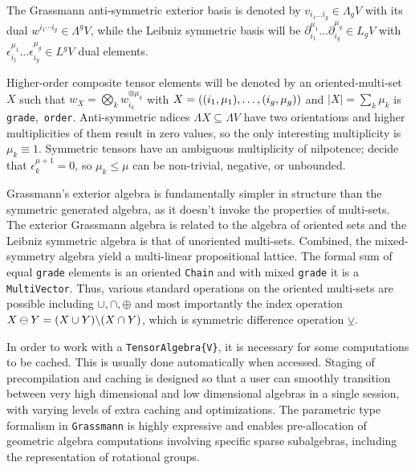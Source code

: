 \documentclass{juliacon}
\begin{document}
\begin{definition}
	The Grassmann anti-symmetric exterior basis is denoted by $v_{i_1\dots i_g}\in\Lambda_gV$ with its dual $w^{i_1\cdots i_g}\in\Lambda^gV$, while the Leibniz symmetric basis will be $\partial_{i_1}^{\mu_1}\dots\partial_{i_g}^{\mu_g}\in L_gV$ with $\epsilon_{i_1}^{\mu_1}\dots\epsilon_{i_g}^{\mu_g}\in L^gV$ dual elements.
\end{definition}
Higher-order composite tensor elements will be denoted by an oriented-multi-set $X$ %
such that $w_X = \bigotimes_k w_{i_k}^{\otimes\mu_k}$ with $X = \left((i_1,\mu_1),\dots,(i_g,\mu_g)\right)$ and $|X|=\sum_k\mu_k$ is \verb`grade`,$\,$ \verb`order`.
Anti-symmetric ndices $\Lambda X\subseteq\Lambda V$ have two orientations and higher multiplicities of them result in zero values, so the only interesting multiplicity is $\mu_k\equiv 1$.
Symmetric tensors have an ambiguous multiplicity of nilpotence; decide that $\epsilon_k^{\mu+1}=0$, so $\mu_k\leq\mu$ can be non-trivial, negative, or unbounded.

Grassmann's exterior algebra is fundamentally simpler in structure than the symmetric generated algebra, as it doesn't invoke the properties of multi-sets.
The exterior Grassmann algebra is related to the algebra of oriented sets and the Leibniz symmetric algebra is that of unoriented multi-sets.
Combined, the mixed-symmetry algebra yield a multi-linear propositional lattice.
The formal sum of equal \verb`grade` elements is an oriented \verb`Chain` and with mixed \verb`grade` it is a \verb`MultiVector`.
Thus, various standard operations on the oriented multi-sets are possible including $\cup,\cap,\oplus$ and most importantly the index operation $X\ominus Y=(X\cup Y)\backslash(X\cap Y)$, which is symmetric difference operation $\veebar$.

In order to work with a \verb`TensorAlgebra{V}`, it is necessary for some computations to be cached. This is usually done automatically when accessed.
Staging of precompilation and caching is designed so that a user can smoothly transition between very high dimensional and low dimensional algebras in a single session, with varying levels of extra caching and optimizations.
The parametric type formalism in \verb`Grassmann` is highly expressive and enables pre-allocation of geometric algebra computations involving specific sparse subalgebras, including the representation of rotational groups.
\end{document}
